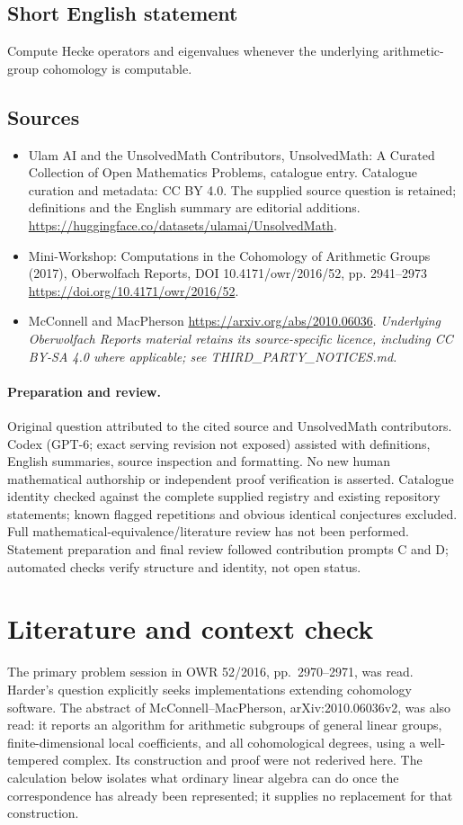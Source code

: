 \documentclass[11pt]{article}
\begin{document}
\subsection{Short English statement}
Compute Hecke operators and eigenvalues whenever the underlying arithmetic-group cohomology is computable.
\subsection{Sources}
\begin{itemize}
\item[S1] Ulam AI and the UnsolvedMath Contributors, UnsolvedMath: A Curated Collection of Open Mathematics Problems, catalogue entry. Catalogue curation and metadata: CC BY 4.0. The supplied source question is retained; definitions and the English summary are editorial additions.
\url{https://huggingface.co/datasets/ulamai/UnsolvedMath}.
\item[S2] Mini-Workshop: Computations in the Cohomology of Arithmetic Groups (2017), Oberwolfach Reports, DOI 10.4171/owr/2016/52, pp. 2941--2973
\url{https://doi.org/10.4171/owr/2016/52}.
\item[S3] McConnell and MacPherson
\url{https://arxiv.org/abs/2010.06036}.
\textit{Underlying Oberwolfach Reports material retains its source-specific licence, including CC BY-SA 4.0 where applicable; see THIRD\_PARTY\_NOTICES.md.}
\end{itemize}
\paragraph{Preparation and review.}
Original question attributed to the cited source and UnsolvedMath contributors. Codex (GPT-6; exact serving revision not exposed) assisted with definitions, English summaries, source inspection and formatting. No new human mathematical authorship or independent proof verification is asserted. Catalogue identity checked against the complete supplied registry and existing repository statements; known flagged repetitions and obvious identical conjectures excluded. Full mathematical-equivalence/literature review has not been performed. Statement preparation and final review followed contribution prompts C and D; automated checks verify structure and identity, not open status.
\label{end:statement}

\section{Literature and context check}
The primary problem session in OWR 52/2016, pp.~2970--2971, was read. Harder's question explicitly seeks implementations extending cohomology software. The abstract of McConnell--MacPherson, arXiv:2010.06036v2, was also read: it reports an algorithm for arithmetic subgroups of general linear groups, finite-dimensional local coefficients, and all cohomological degrees, using a well-tempered complex. Its construction and proof were not rederived here. The calculation below isolates what ordinary linear algebra can do once the correspondence has already been represented; it supplies no replacement for that construction.
\end{document}
